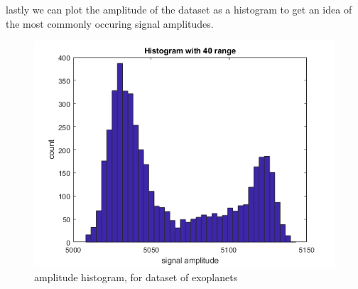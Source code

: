 lastly we can plot the amplitude of the dataset as a histogram to get an
idea of the most commonly occuring signal amplitudes.

\newpage

\begin{figure}[h]
  \centering
  \includegraphics[width=\textwidth]{matlabstuff/amplitudeHistogram.png}
  \caption{amplitude histogram, for dataset of exoplanets}%
  \label{fig:amplitudeHistogram}
\end{figure}

\newpage
